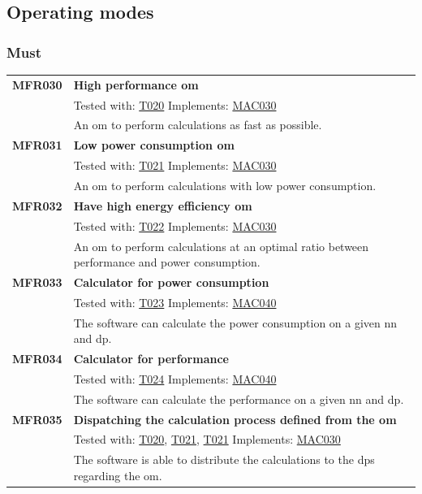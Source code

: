 \documentclass[parskip=full]{scrartcl}
\begin{document}
\newpage

\subsection{Operating modes}
\subsubsection{Must}
\begin{tabular}{p{2cm}p{11.4cm}}
\textbf{MFR030} \hypertarget{MFR030} & \textbf{High \gls{performance} \gls{om}}\\         
& Tested with: \hyperlink{T020}{T020} Implements: \hyperlink{MAC030}{MAC030} \\                           
& An \gls{om} to perform calculations as fast as possible.\\
\textbf{MFR031} \hypertarget{MFR031}& \textbf{Low \gls{power consumption} \gls{om}}\\ 
& Tested with: \hyperlink{T021}{T021} Implements: \hyperlink{MAC030}{MAC030} \\                                   
& An \gls{om} to perform calculations with low \gls{power consumption}.\\
\textbf{MFR032} \hypertarget{MFR032}& \textbf{Have high energy efficiency \gls{om}}\\      
& Tested with: \hyperlink{T022}{T022}  Implements: \hyperlink{MAC030}{MAC030} \\                              
& An \gls{om} to perform calculations at an optimal ratio between \gls{performance} and \gls{power consumption}.\\
\textbf{MFR033}\hypertarget{MFR033} & \textbf{Calculator for \gls{power consumption}}\\ & Tested with: \hyperlink{T023}{T023} Implements:  \hyperlink{MAC040}{MAC040} \\                                   
& The software can calculate the \gls{power consumption} on a given \gls{nn} and \gls{dp}.\\
\textbf{MFR034}\hypertarget{MFR034} & \textbf{Calculator for \gls{performance}}\\
& Tested with: \hyperlink{T024}{T024} Implements: \hyperlink{MAC040}{MAC040} \\                                    
& The software can calculate the \gls{performance} on a given \gls{nn} and \gls{dp}.\\
\textbf {MFR035} \hypertarget{MFR035}& \textbf{Dispatching the calculation process defined from the \gls{om}}\\
& Tested with: \hyperlink{T020}{T020}, \hyperlink{T021}{T021}, \hyperlink{T021}{T021} Implements: \hyperlink{MAC030}{MAC030}\\
& The software is able to distribute the calculations to the \glspl{dp} regarding the \gls{om}. \\
\end{tabular}
\end{document}
